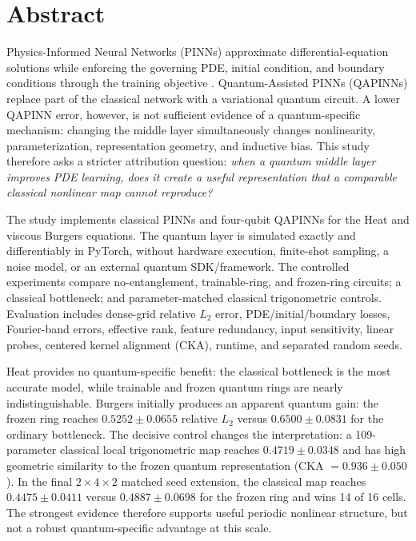 \documentclass[10pt,a4paper]{article}
\begin{document}
\section*{Abstract}

Physics-Informed Neural Networks (PINNs) approximate differential-equation solutions while enforcing the governing PDE, initial condition, and boundary conditions through the training objective \cite{raissi2019}. Quantum-Assisted PINNs (QAPINNs) replace part of the classical network with a variational quantum circuit. A lower QAPINN error, however, is not sufficient evidence of a quantum-specific mechanism: changing the middle layer simultaneously changes nonlinearity, parameterization, representation geometry, and inductive bias. This study therefore asks a stricter attribution question: \emph{when a quantum middle layer improves PDE learning, does it create a useful representation that a comparable classical nonlinear map cannot reproduce?}

The study implements classical PINNs and four-qubit QAPINNs for the Heat and viscous Burgers equations. The quantum layer is simulated exactly and differentiably in PyTorch, without hardware execution, finite-shot sampling, a noise model, or an external quantum SDK/framework. The controlled experiments compare no-entanglement, trainable-ring, and frozen-ring circuits; a classical bottleneck; and parameter-matched classical trigonometric controls. Evaluation includes dense-grid relative $L_2$ error, PDE/initial/boundary losses, Fourier-band errors, effective rank, feature redundancy, input sensitivity, linear probes, centered kernel alignment (CKA), runtime, and separated random seeds.

Heat provides no quantum-specific benefit: the classical bottleneck is the most accurate model, while trainable and frozen quantum rings are nearly indistinguishable. Burgers initially produces an apparent quantum gain: the frozen ring reaches $0.5252\pm0.0655$ relative $L_2$ versus $0.6500\pm0.0831$ for the ordinary bottleneck. The decisive control changes the interpretation: a 109-parameter classical local trigonometric map reaches $0.4719\pm0.0348$ and has high geometric similarity to the frozen quantum representation (CKA $=0.936\pm0.050$). In the final $2\times4\times2$ matched seed extension, the classical map reaches $0.4475\pm0.0411$ versus $0.4887\pm0.0698$ for the frozen ring and wins 14 of 16 cells. The strongest evidence therefore supports useful periodic nonlinear structure, but not a robust quantum-specific advantage at this scale.
\end{document}

